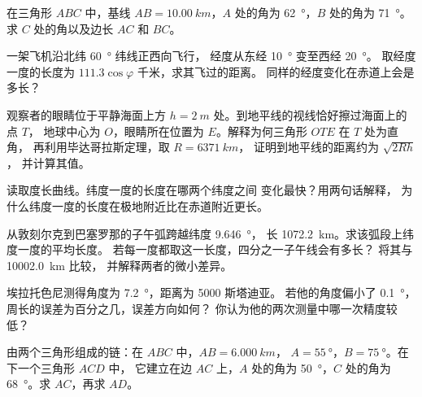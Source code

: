 \begin{exercise}[$\star\star$]\label{exo:g10:measuring-the-earth:7}
在三角形 $ABC$ 中，基线 $AB = \qty{10.00}{km}$，$A$ 处的角为
\qty{62}{\degree}，$B$ 处的角为 \qty{71}{\degree}。求
$C$ 处的角以及边长 $AC$ 和 $BC$。
\end{exercise}

\begin{exercise}[$\star\star$]\label{exo:g10:measuring-the-earth:8}
一架飞机沿北纬 \qty{60}{\degree} 纬线正西向飞行，
经度从东经 \qty{10}{\degree} 变至西经 \qty{20}{\degree}。
取经度一度的长度为 $111.3 \cos \varphi$ 千米，求其飞过的距离。
同样的经度变化在赤道上会是多长？
\end{exercise}

\begin{exercise}[$\star\star$]\label{exo:g10:measuring-the-earth:9}
观察者的眼睛位于平静海面上方 $h = \qty{2}{m}$ 处。到地平线的视线恰好擦过海面上的点 $T$，
地球中心为 $O$，眼睛所在位置为 $E$。解释为何三角形 $OTE$ 在 $T$ 处为直角，
再利用毕达哥拉斯定理，取 $R = \qty{6371}{km}$，
证明到地平线的距离约为 $\sqrt{2Rh}$，
并计算其值。
\end{exercise}

\begin{exercise}[$\star\star$]\label{exo:g10:measuring-the-earth:10}
读取度长曲线。纬度一度的长度在哪两个纬度之间
变化最快？用两句话解释，
为什么纬度一度的长度在极地附近比在赤道附近更长。
\end{exercise}

\begin{exercise}[$\star\star$]\label{exo:g10:measuring-the-earth:11}
从敦刻尔克到巴塞罗那的子午弧跨越纬度 \qty{9.646}{\degree}，
长 \qty{1072.2}{km}。求该弧段上纬度一度的平均长度。
若每一度都取这一长度，四分之一子午线会有多长？
将其与 \qty{10002.0}{km} 比较，
并解释两者的微小差异。
\end{exercise}

\begin{exercise}[$\star\star\star$]\label{exo:g10:measuring-the-earth:12}
埃拉托色尼测得角度为 \qty{7.2}{\degree}，距离为 5000 斯塔迪亚。
若他的角度偏小了 \qty{0.1}{\degree}，
周长的误差为百分之几，误差方向如何？
你认为他的两次测量中哪一次精度较低？
\end{exercise}

\begin{exercise}[$\star\star\star$]\label{exo:g10:measuring-the-earth:13}
由两个三角形组成的链：在 $ABC$ 中，$AB = \qty{6.000}{km}$，
$A = \qty{55}{\degree}$，$B = \qty{75}{\degree}$。在下一个三角形 $ACD$ 中，
它建立在边 $AC$ 上，$A$ 处的角为 \qty{50}{\degree}，$C$ 处的角为
\qty{68}{\degree}。求 $AC$，再求 $AD$。
\end{exercise}

